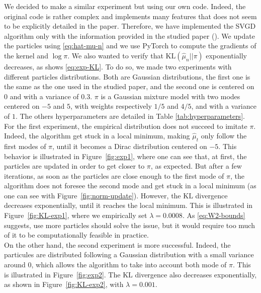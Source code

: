 \documentclass{article}
\newcommand{\KL}{\mathrm{KL}}
\begin{document}
We decided to make a similar experiment but using our own code.
Indeed, the original code is rather complex and implements
many features that does not seem to be explicitly detailed in the paper.
Therefore, we have implemented the SVGD algorithm only with the information
provided in the studied paper (\cite{main-paper}).
We update the particles using \eqref{eq:hat-mu-n} and
we use PyTorch to compute the gradients of the kernel and $\log \pi$.
We also wanted to verify that $\KL(\hat{\mu}_n || \pi)$ exponentially
decreases, as shows \eqref{eq:exp-KL}.
To do so, we made two experiments with different particles
distributions. Both are Gaussian distributions, the first one
is the same as the one used in the studied paper, and the second one
is centered on $0$ and with a variance of $0.3$.
$\pi$ is a Gaussian mixture model with two modes centered on $-5$ and $5$,
with weights respectively $1/5$ and $4/5$, and with a variance of $1$.
The others hyperparameters are detailed in Table \ref{tab:hyperparameters}.\\

For the first experiment,
the empirical distribution does not succeed to imitate $\pi$.
Indeed, the algorithm get stuck in a local minimum, making $\hat{\mu}_t$
only follow the first modes of $\pi$, until it becomes a Dirac distribution
centered on $-5$.
This behavior is illustrated in Figure~\ref{fig:exp1}, where
one can see that, at first, the particles are updated in order
to get closer to $\pi$, as expected. But after a few iterations,
as soon as the particles are close enough to the first mode of $\pi$,
the algorithm does not foresee the second mode and get stuck in a local minimum
(as one can see with Figure~\ref{fig:norm-update}).
However, the $\KL$ divergence decreases exponentially, until it reaches
the local minimum. This is illustrated in Figure~\ref{fig:KL-exp1},
where we empirically set $\lambda = 0.0008$.
As \eqref{eq:W2-bounds} suggests, use more particles
should solve the issue, but it would require too much of it to be
computationally feasible in practice.\\

On the other hand, the second experiment is more successful.
Indeed, the particules are distributed following a Gaussian distribution
with a small variance around $0$, which allows the algorithm
to take into account both mode of $\pi$. This is illustrated in
Figure~\ref{fig:exp2}. The $\KL$ divergence also decreases exponentially,
as shown in Figure~\ref{fig:KL-exp2}, with $\lambda = 0.001$.
\end{document}
